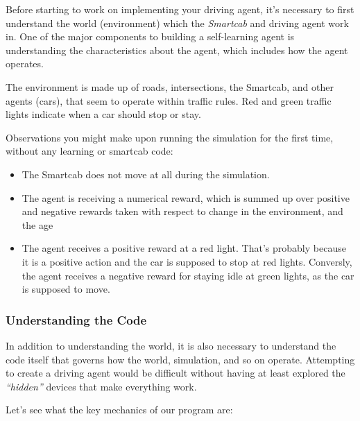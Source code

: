 \documentclass[11pt]{article}
\providecommand{\tightlist}{%
      \setlength{\itemsep}{0pt}\setlength{\parskip}{0pt}}
\begin{document}
Before starting to work on implementing your driving agent, it's
necessary to first understand the world (environment) which the
\emph{Smartcab} and driving agent work in. One of the major components
to building a self-learning agent is understanding the characteristics
about the agent, which includes how the agent operates.

    The environment is made up of roads, intersections, the Smartcab, and
other agents (cars), that seem to operate within traffic rules. Red and
green traffic lights indicate when a car should stop or stay.

Observations you might make upon running the simulation for the first
time, without any learning or smartcab code:

\begin{itemize}
\tightlist
\item
  The Smartcab does not move at all during the simulation.
\item
  The agent is receiving a numerical reward, which is summed up over
  positive and negative rewards taken with respect to change in the
  environment, and the age
\item
  The agent receives a positive reward at a red light. That's probably
  because it is a positive action and the car is supposed to stop at red
  lights. Conversly, the agent receives a negative reward for staying
  idle at green lights, as the car is supposed to move.
\end{itemize}

    \hypertarget{understanding-the-code}{%
\subsubsection{Understanding the Code}\label{understanding-the-code}}

In addition to understanding the world, it is also necessary to
understand the code itself that governs how the world, simulation, and
so on operate. Attempting to create a driving agent would be difficult
without having at least explored the \emph{``hidden''} devices that make
everything work.

Let's see what the key mechanics of our program are:
\end{document}
